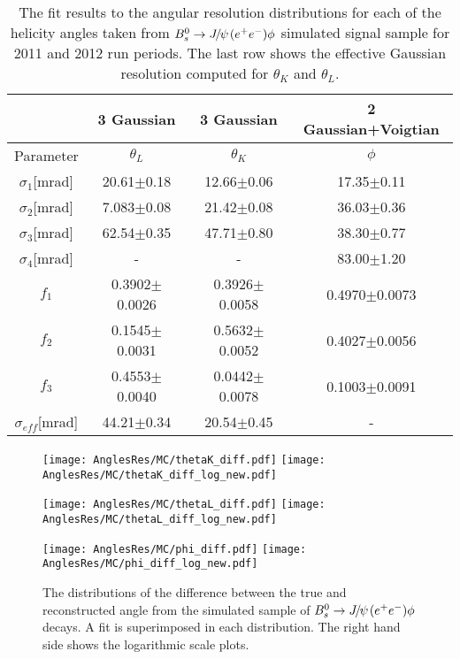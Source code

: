 \begin{table}[htb]
  \caption{
    The fit results to the angular resolution distributions for each of the helicity angles taken from ${{B}^0_{s}}\rightarrow{\ensuremath{{J\mskip -3mu/\mskip -2mu\psi\mskip 2mu}}}({e^+e^-})\phi$ simulated signal sample for 2011 and 2012 run periods. The last row shows the effective Gaussian resolution computed for $\theta_{K}$ and $\theta_{L}$.
}
    \small{
 \begin{center}
  \begin{tabular}{cccc}
   \hline
    & 3 Gaussian & 3 Gaussian & 2 Gaussian+Voigtian\\
  \hline
  Parameter & $\theta_{L}$ &  $\theta_{K}$ &$\phi$\\
  \hline
    $\sigma_{1}$[mrad]  & 20.61$\pm$0.18 &  12.66$\pm$0.06 &  17.35$\pm$0.11 \\
    $\sigma_{2}$[mrad]  & 7.083$\pm$0.08 &  21.42$\pm$0.08 &  36.03$\pm$0.36 \\
    $\sigma_{3}$[mrad]  & 62.54$\pm$0.35 &  47.71$\pm$0.80 &  38.30$\pm$0.77 \\
    $\sigma_{4}$[mrad]  & - &  - &  83.00$\pm$1.20 \\
    $f_{1}$  & 0.3902$\pm$0.0026 &  0.3926$\pm$0.0058 &  0.4970$\pm$0.0073 \\
    $f_{2}$  & 0.1545$\pm$0.0031 &  0.5632$\pm$0.0052 &  0.4027$\pm$0.0056 \\
    $f_{3}$  & 0.4553$\pm$0.0040 &  0.0442$\pm$0.0078 &  0.1003$\pm$0.0091 \\
    \hline
    $\sigma_{eff}$[mrad]  & 44.21$\pm$0.34 &  20.54$\pm$0.45 &  - \\
   \hline
    \end{tabular}
  \end{center}
   }
\label{tab:AnglesRes}
\end{table}

\begin{figure}[hbt]
  \begin{center}
    \texttt{[image: AnglesRes/MC/thetaK\_diff.pdf]}
    \texttt{[image: AnglesRes/MC/thetaK\_diff\_log\_new.pdf]}
     \vspace*{-0.5cm}
  \end{center}
  \begin{center}
    \texttt{[image: AnglesRes/MC/thetaL\_diff.pdf]}
    \texttt{[image: AnglesRes/MC/thetaL\_diff\_log\_new.pdf]}
     \vspace*{-0.5cm}
  \end{center}
  \begin{center}
    \texttt{[image: AnglesRes/MC/phi\_diff.pdf]}
    \texttt{[image: AnglesRes/MC/phi\_diff\_log\_new.pdf]}
    \vspace*{-0.5cm}
  \end{center}
    \caption{
   The distributions of the difference between the true and reconstructed angle from the simulated sample of ${{B}^0_{s}}\rightarrow{\ensuremath{{J\mskip -3mu/\mskip -2mu\psi\mskip 2mu}}}({e^+e^-})\phi$ decays. A fit is superimposed in each distribution. The right hand side shows the logarithmic scale plots.
}
  \label{fig:AnglesRes} 
\end{figure}
\clearpage

